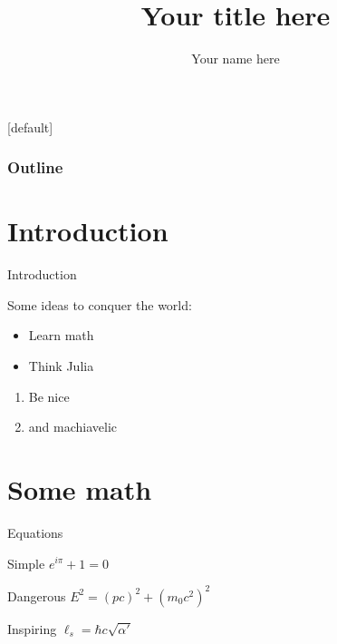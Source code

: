 \documentclass{beamer}
\title{Your title here}
\author{Your name here}
\institute{Your institution here}
\begin{document}
[default]

\begin{frame}[noframenumbering]
  \titlepage{}
\end{frame}


\begin{frame}[noframenumbering]
  \frametitle{Outline}
  \tableofcontents
\end{frame}


\section{Introduction}

\begin{frame}{Introduction}

  Some ideas to conquer the world:

  \begin{itemize}
  \item Learn math
  \item Think Julia
  \end{itemize}

  \begin{enumerate}
  \item Be nice
  \item and machiavelic
  \end{enumerate}

\end{frame}

\section{Some math}

\begin{frame}{Equations}
  \begin{block}{Simple}
    \(e^{i\pi}+1 =0\)
  \end{block}
  
  \begin{alertblock}{Dangerous}
    \(E^2={(pc)}^2+{(m_0c^2)}^2\)
  \end{alertblock}

  \begin{exampleblock}{Inspiring}
    \(\ell_s = \hbar c \sqrt{\alpha'}\)
  \end{exampleblock}
\end{frame}

\begin{frame}
  \centering \Large
  \textbf{\color{bluish}{Thanks!}}
\end{frame}
\end{document}
